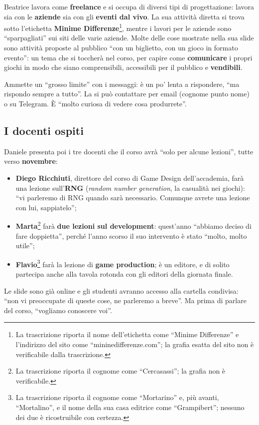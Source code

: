 Beatrice lavora come \textbf{freelance} e si occupa di diversi tipi di
progettazione: lavora sia con le \textbf{aziende} sia con gli \textbf{eventi dal
vivo}. La sua attività diretta si trova sotto l'etichetta \textbf{Minime
Differenze}\footnote{La trascrizione riporta il nome dell'etichetta come
``Minime Differenze'' e l'indirizzo del sito come ``mininedifferenze.com''; la
grafia esatta del sito non è verificabile dalla trascrizione.}, mentre i lavori
per le aziende sono ``sparpagliati'' sui siti delle varie aziende. Molte delle
cose mostrate nella sua slide sono attività proposte al pubblico ``con un
biglietto, con un gioco in formato evento'': un tema che si toccherà nel corso,
per capire come \textbf{comunicare} i propri giochi in modo che siano
comprensibili, accessibili per il pubblico e \textbf{vendibili}.

Ammette un ``grosso limite'' con i messaggi: è un po' lenta a rispondere, ``ma
rispondo sempre a tutto''. La si può contattare per email (cognome punto nome) o
su Telegram. È ``molto curiosa di vedere cosa produrrete''.

\subsection{I docenti ospiti}

Daniele presenta poi i tre docenti che il corso avrà ``solo per alcune
lezioni'', tutte verso \textbf{novembre}:
\begin{itemize}
  \item \textbf{Diego Ricchiuti}, direttore del corso di Game Design
        dell'accademia, farà una lezione sull'\textbf{RNG} (\emph{random number
        generation}, la casualità nei giochi): ``vi parleremo di RNG quando sarà
        necessario. Comunque avrete una lezione con lui, sappiatelo'';
  \item \textbf{Marta}\footnote{La trascrizione riporta il cognome come
        ``Cercasassi''; la grafia non è verificabile.} farà \textbf{due lezioni
        sul development}: quest'anno ``abbiamo deciso di fare doppietta'',
        perché l'anno scorso il suo intervento è stato ``molto, molto utile'';
  \item \textbf{Flavio}\footnote{La trascrizione riporta il cognome come
        ``Mortarino'' e, più avanti, ``Mortalino'', e il nome della sua casa
        editrice come ``Grampibert''; nessuno dei due è ricostruibile con
        certezza.} farà la lezione di \textbf{game production}; è un editore, e
        di solito partecipa anche alla tavola rotonda con gli editori della
        giornata finale.
\end{itemize}
Le slide sono già online e gli studenti avranno accesso alla cartella condivisa:
``non vi preoccupate di queste cose, ne parleremo a breve''. Ma prima di parlare
del corso, ``vogliamo conoscere voi''.

